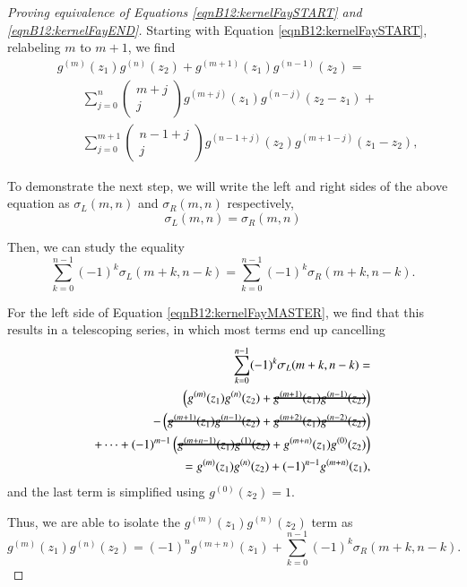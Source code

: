 \begin{proof}[Proving equivalence of Equations \ref{eqnB12:kernelFaySTART} and \ref{eqnB12:kernelFayEND}]

Starting with Equation \ref{eqnB12:kernelFaySTART}, relabeling $m$ to $m+1$, we find
\begin{align}
    & g^{(m)}(z_1)g^{(n)}(z_2)+g^{(m+1)}(z_1)g^{(n-1)}(z_2) =
    \\ & \quad \quad \sum_{j=0}^{n} \begin{pmatrix} m+j \\ j \end{pmatrix} g^{(m+j)}(z_1) g^{(n-j)}(z_2-z_1) +
    \\ & \quad \quad \sum_{j=0}^{m+1} \begin{pmatrix} n-1+j \\ j \end{pmatrix} g^{(n-1+j)}(z_2) g^{(m+1-j)}(z_1-z_2),
\end{align}

To demonstrate the next step, we will write the left and right sides of the above equation as
$\sigma_{L}(m,n)$ and $\sigma_{R}(m,n)$ respectively,
\begin{equation}
    \sigma_L(m,n) = \sigma_R(m,n)
\end{equation}


Then, we can study the equality
\begin{equation}
    \sum_{k=0}^{n-1} (-1)^k \sigma_L(m+k,n-k) = \sum_{k=0}^{n-1} (-1)^k \sigma_R(m+k,n-k).\label{eqnB12:kernelFayMASTER}
\end{equation}

For the left side of Equation \ref{eqnB12:kernelFayMASTER}, we find that this results in a telescoping series, in which most terms end up cancelling
\begin{align}
    \sum_{k=0}^{n-1} (-1)^k \sigma_L(m+k,n-k) = \\
    \left(g^{(m)}(z_1)g^{(n)}(z_2)+\hcancel{g^{(m+1)}(z_1)g^{(n-1)}(z_2)}\right) \\
    - \left(\hcancel{g^{(m+1)}(z_1)g^{(n-1)}(z_2)}+\hcancel{g^{(m+2)}(z_1)g^{(n-2)}(z_2)}\right) \\
    + \cdots + (-1)^{m-1} \left(\hcancel{g^{(m+n-1)}(z_1)g^{(1)}(z_2)}+g^{(m+n)}(z_1)g^{(0)}(z_2)\right) \\
    = g^{(m)}(z_1)g^{(n)}(z_2) + (-1)^{n-1} g^{(m+n)}(z_1),
\end{align}
and the last term is simplified using $g^{(0)}(z_2)=1$.

Thus, we are able to isolate the $g^{(m)}(z_1)g^{(n)}(z_2)$ term as
\begin{equation}
    g^{(m)}(z_1)g^{(n)}(z_2) = (-1)^n g^{(m+n)}(z_1) + \sum_{k=0}^{n-1} (-1)^k \sigma_R(m+k,n-k).
\end{equation}


\end{proof}
